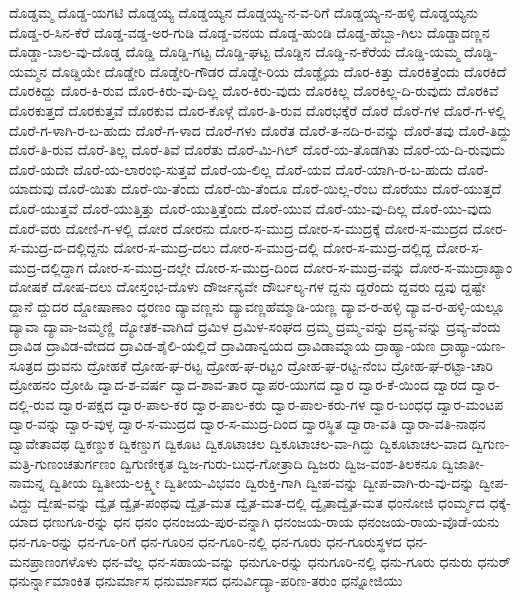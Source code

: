 ದೊಡ್ಡಮ್ಮ
ದೊಡ್ಡ-ಯಗಟಿ
ದೊಡ್ಡಯ್ಯ
ದೊಡ್ಡಯ್ಯನ
ದೊಡ್ಡಯ್ಯ-ನ-ವ-ರಿಗೆ
ದೊಡ್ಡಯ್ಯ-ನ-ಹಳ್ಳಿ
ದೊಡ್ಡಯ್ಯನು
ದೊಡ್ಡ-ರ-ಸಿನ-ಕೆರೆ
ದೊಡ್ಡ-ವಡ್ಡ-ಅರ-ಗುಡಿ
ದೊಡ್ಡ-ವನಯ
ದೊಡ್ಡ-ಹುಂಡಿ
ದೊಡ್ಡ-ಹೆಬ್ಬಾ-ಗಿಲು
ದೊಡ್ಡಾದಣ್ಣನ
ದೊಡ್ಡಾ-ಬಾಲ-ವು-ದೊಡ್ಡ
ದೊಡ್ಡಿ
ದೊಡ್ಡಿ-ಗಟ್ಟ
ದೊಡ್ಡಿ-ಘಟ್ಟ
ದೊಡ್ಡಿನ
ದೊಡ್ಡಿ-ನ-ಕೆರೆಯ
ದೊಡ್ಡಿ-ಯಮ್ಮ
ದೊಡ್ಡಿ-ಯಮ್ಮನ
ದೊಡ್ಡಿಯೇ
ದೊಡ್ಡೇರಿ
ದೊಡ್ಡೇರಿ-ಗೌಡರ
ದೊಡ್ಡೇ-ರಿಯ
ದೊಡ್ಡೈಯ
ದೊರ-ಕಿತ್ತು
ದೊರಕಿತ್ತೆಂದು
ದೊರಕಿದೆ
ದೊರಕಿದ್ದು
ದೊರ-ಕಿ-ರುವ
ದೊರ-ಕಿರು-ವು-ದಿಲ್ಲ
ದೊರ-ಕಿರು-ವುದು
ದೊರಕಿಲ್ಲ
ದೊರಕಿಲ್ಲ-ದಿ-ರುವುದು
ದೊರಕಿವೆ
ದೊರಕುತ್ತದೆ
ದೊರಕುತ್ತವೆ
ದೊರಕುವ
ದೊರ-ಕೊಳ್ಗೆ
ದೊರ-ತಿ-ರುವ
ದೊರಭಕ್ಕೆರೆ
ದೊರೆ
ದೊರೆ-ಗಳ
ದೊರೆ-ಗ-ಳಲ್ಲಿ
ದೊರೆ-ಗ-ಳಾಗಿ-ರ-ಬ-ಹುದು
ದೊರೆ-ಗ-ಳಾದ
ದೊರೆ-ಗಳು
ದೊರೆತ
ದೊರೆ-ತ-ನದಿ-ರ-ವನ್ನು
ದೊರೆ-ತವು
ದೊರೆ-ತಿದ್ದು
ದೊರೆ-ತಿ-ರುವ
ದೊರೆ-ತಿಲ್ಲ
ದೊರೆ-ತಿವೆ
ದೊರೆತು
ದೊರೆ-ಮಿ-ಗಿಲ್
ದೊರೆ-ಯ-ತೊಡಗಿತು
ದೊರೆ-ಯ-ದಿ-ರುವುದು
ದೊರೆ-ಯದೇ
ದೊರೆ-ಯ-ಲಾರಂಭಿ-ಸುತ್ತವೆ
ದೊರೆ-ಯ-ಲಿಲ್ಲ
ದೊರೆ-ಯವ
ದೊರೆ-ಯಾಗಿ-ರ-ಬ-ಹುದು
ದೊರೆ-ಯಾದುವು
ದೊರೆ-ಯಿತು
ದೊರೆ-ಯಿ-ತೆಂದು
ದೊರೆ-ಯಿ-ತೆಂದೂ
ದೊರೆ-ಯಿಲ್ಲ-ರೆಂಬ
ದೊರೆಯು
ದೊರೆ-ಯುತ್ತದೆ
ದೊರೆ-ಯುತ್ತವೆ
ದೊರೆ-ಯುತ್ತಿತ್ತು
ದೊರೆ-ಯುತ್ತಿತ್ತೆಂದು
ದೊರೆ-ಯುವ
ದೊರೆ-ಯು-ವು-ದಿಲ್ಲ
ದೊರೆ-ಯು-ವುದು
ದೊರೆ-ವರು
ದೋಣಿ-ಗ-ಳಲ್ಲಿ
ದೋರ
ದೋರನು
ದೋರ-ಸ-ಮುದ್ರ
ದೋರ-ಸ-ಮುದ್ರಕ್ಕೆ
ದೋರ-ಸ-ಮುದ್ರದ
ದೋರ-ಸ-ಮುದ್ರ-ದ-ದಲ್ಲಿದ್ದನು
ದೋರ-ಸ-ಮುದ್ರ-ದಲು
ದೋರ-ಸ-ಮುದ್ರ-ದಲ್ಲಿ
ದೋರ-ಸ-ಮುದ್ರ-ದಲ್ಲಿದ್ದ
ದೋರ-ಸ-ಮುದ್ರ-ದಲ್ಲಿದ್ದಾಗ
ದೋರ-ಸ-ಮುದ್ರ-ದಲ್ಲೇ
ದೋರ-ಸ-ಮುದ್ರ-ದಿಂದ
ದೋರ-ಸ-ಮುದ್ರ-ವನ್ನು
ದೋರ-ಸ-ಮುದ್ರಾಖ್ಯಾಂ
ದೋಷಕೆ
ದೋಷ-ದಲು
ದೋಸ್ತಂಭ-ದೊಳು
ದೌರ್ಜನ್ಯವೇ
ದೌರ್ಬಲ್ಯ-ಗಳ
ದ್ದನು
ದ್ದರೆಂದು
ದ್ದವರು
ದ್ದವು
ದ್ದಷ್ಟೇ
ದ್ದಾನೆ
ದ್ದುದರ
ದ್ದೋಷಾಣಾಂ
ದ್ಧರಣಂ
ದ್ಯಾವಣ್ಣನು
ದ್ಯಾವಣ್ಣಹೆಮ್ಮಾಡಿ-ಯಣ್ಣ
ದ್ಯಾವ-ರ-ಹಳ್ಳಿ
ದ್ಯಾವ-ರ-ಹಳ್ಳಿ-ಯಲ್ಲೂ
ದ್ಯಾವಾ
ದ್ಯಾವಾ-ಜಮ್ಮಣ್ಣಿ
ದ್ಯೋತಕ-ವಾಗಿದೆ
ದ್ರಮಿಳ
ದ್ರಮಿಳ-ಸಂಘದ
ದ್ರಮ್ಮ
ದ್ರಮ್ಮ-ವನ್ನು
ದ್ರವ್ಯ-ವನ್ನು
ದ್ರವ್ಯ-ವೆಂದು
ದ್ರಾವಿಡ
ದ್ರಾವಿಡ-ವೇದದ
ದ್ರಾವಿಡ-ಶೈಲಿ-ಯಲ್ಲಿದೆ
ದ್ರಾವಿಡಾನ್ವಯದ
ದ್ರಾವಿಡಾಮ್ನಾಯ
ದ್ರಾಹ್ಯಾ-ಯಣ
ದ್ರಾಹ್ಯಾ-ಯಣ-ಸೂತ್ರದ
ದ್ರುವನು
ದ್ರೋಹಕೆ
ದ್ರೋಹ-ಘ-ರಟ್ಟ
ದ್ರೋಹ-ಘ-ರಟ್ಟಂ
ದ್ರೋಹ-ಘ-ರಟ್ಟ-ನೆಂಬ
ದ್ರೋಹ-ಘ-ರಟ್ಟಾ-ಚಾರಿ
ದ್ರೋಹನಂ
ದ್ರೋಹಿ
ದ್ವಾದ-ಶ-ವರ್ಷ
ದ್ವಾದ-ಶಾವ-ತಾರ
ದ್ವಾಪರ-ಯುಗದ
ದ್ವಾರ
ದ್ವಾರ-ಕೆ-ಯಿಂದ
ದ್ವಾರದ
ದ್ವಾರ-ದಲ್ಲಿ-ರುವ
ದ್ವಾರ-ಪಕ್ಷದ
ದ್ವಾರ-ಪಾಲ-ಕರ
ದ್ವಾರ-ಪಾಲ-ಕರು
ದ್ವಾರ-ಪಾಲ-ಕರು-ಗಳ
ದ್ವಾರ-ಬಂಧಧ
ದ್ವಾರ-ಮಂಟಪ
ದ್ವಾರ-ವನ್ನು
ದ್ವಾರ-ವುಳ್ಳ
ದ್ವಾರ-ಸ-ಮುದ್ರದ
ದ್ವಾರ-ಸ-ಮುದ್ರ-ದಿಂದ
ದ್ವಾರಸ್ಥಿತ
ದ್ವಾರಾ-ವತಿ
ದ್ವಾರಾ-ವತಿ-ನಾಥನ
ದ್ವಾವೇತಾವಥ
ದ್ವಿಕಣ್ಡುಕ
ದ್ವಿಕಣ್ಡುಗ
ದ್ವಿಕೂಟ
ದ್ವಿಕೂಟಾಚಲ
ದ್ವಿಕೂಟಾಚಲ-ವಾ-ಗಿದ್ದು
ದ್ವಿಕೂಟಾಚಲ-ವಾದ
ದ್ವಿಗುಣ-ಮತ್ರಿ-ಗುಣಂಚತುರ್ಗಣಂ
ದ್ವಿಗುಣೀಕೃತ
ದ್ವಿಜ-ಗುರು-ಬುಧ-ಗೋತ್ರಾದಿ
ದ್ವಿಜರು
ದ್ವಿಜ-ವಂಶ-ತಿಲಕನೂ
ದ್ವಿಜಾತೀ-ನಾಮನ್ನ
ದ್ವಿತೀಯ
ದ್ವಿತೀಯ-ಲಕ್ಷ್ಮೀ
ದ್ವಿತೀಯ-ವಿಭವಂ
ದ್ವಿರುಕ್ತಿ-ಗಾಗಿ
ದ್ವೀಪ-ವನ್ನು
ದ್ವೀಪ-ವಾಗಿ-ರು-ವು-ದನ್ನು
ದ್ವೀಪ-ವಿದ್ದು
ದ್ವೇಷ-ವನ್ನು
ದ್ವೈತ
ದ್ವೈತ-ಪಂಥವು
ದ್ವೈತ-ಮತ
ದ್ವೈತ-ಮತ-ದಲ್ಲಿ
ದ್ವೈತಾದ್ವೈತ-ಮತ
ಧಂನೋಜಿ
ಧಂರ್ಮ್ಮದ
ಧಕ್ಕೆ-ಯಾದ
ಧಣುಗೂ-ರನ್ನು
ಧನ
ಧನಂ
ಧನಂಜಯ-ಪುರ-ವನ್ನಾಗಿ
ಧನಂಜಯ-ರಾಯ
ಧನಂಜಯ-ರಾಯ-ವೊಡೆ-ಯನು
ಧನ-ಗೂ-ರನ್ನು
ಧನ-ಗೂ-ರಿಗೆ
ಧನ-ಗೂರಿನ
ಧನ-ಗೂರಿ-ನಲ್ಲಿ
ಧನ-ಗೂರು
ಧನ-ಗೂರುಸ್ಥಳದ
ಧನ-ಮನಪ್ರಾಣಂಗಳೊಳು
ಧನ-ವೆಲ್ಲ
ಧನ-ಸಹಾಯ-ವನ್ನು
ಧನುಗೂ-ರನ್ನು
ಧನುಗೂರಿ-ನಲ್ಲಿ
ಧನು-ಗೂರು
ಧನುರು
ಧನುರ್
ಧನುರ್ನ್ನಾಮಾಂಕಿತ
ಧನುರ್ಮಾಸ
ಧನುರ್ಮಾಸದ
ಧನುರ್ವಿದ್ಯಾ-ಪರಿಣ-ತರುಂ
ಧನ್ನೋಜಿಯು
